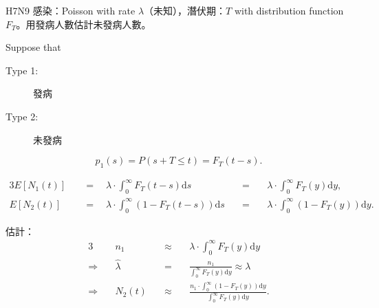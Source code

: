 \begin{example}
H7N9 感染：Poisson with rate $ \lambda $（未知），潛伏期：$ T $ with distribution function $ F_{T} $。用發病人數估計未發病人數。

Suppose that
\begin{description}
  \item[Type 1:] 發病
  \item[Type 2:] 未發病
\end{description}
\[ p_{1}(s) = P(s + T \le t) = F_{T}(t - s). \]

\begin{alignat*}{3}
E[N_{1}(t)]
  & \quad=\quad \lambda \cdot \int_{0}^{\infty} F_{T}(t - s) \mathrm{d}s
  & \quad=\quad & \lambda \cdot \int_{0}^{\infty} F_{T}(y) \mathrm{d}y, \\
E[N_{2}(t)]
  & \quad=\quad \lambda \cdot \int_{0}^{\infty} (1 - F_{T}(t - s)) \mathrm{d}s
  & \quad=\quad & \lambda \cdot \int_{0}^{\infty} (1 - F_{T}(y)) \mathrm{d}y.
\end{alignat*}

估計：
\begin{alignat*}{3}
  & n_{1} & \quad\approx\quad & \lambda \cdot \int_{0}^{\infty} F_{T}(y) \mathrm{d}y \\
\Rightarrow\quad
  & \hat{\lambda} & \quad=\quad & \frac{n_{1}}{\int_{0}^{\infty} F_{T}(y) \mathrm{d}y} \approx \lambda \\
\Rightarrow\quad
  & N_{2}(t) & \quad\approx\quad & \frac{n_{1} \cdot \int_{0}^{\infty} (1 - F_{T}(y)) \mathrm{d}y}{\int_{0}^{\infty} F_{T}(y) \mathrm{d}y}.
\end{alignat*}

\end{example}

